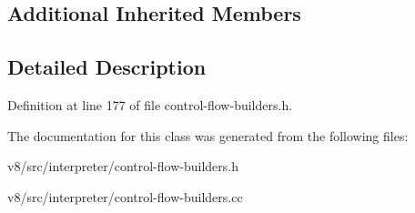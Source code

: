\subsection*{Additional Inherited Members}


\subsection{Detailed Description}


Definition at line 177 of file control-\/flow-\/builders.\+h.



The documentation for this class was generated from the following files\+:\begin{DoxyCompactItemize}
\item 
v8/src/interpreter/control-\/flow-\/builders.\+h\item 
v8/src/interpreter/control-\/flow-\/builders.\+cc\end{DoxyCompactItemize}
